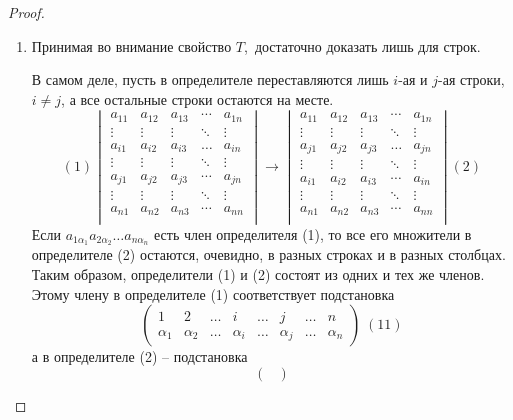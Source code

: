 \documentclass[a4paper,12pt]{article}
\begin{document}
	\begin{proof}
		\
		\begin{enumerate}
			\item Принимая во внимание свойство $T$,\ достаточно доказать лишь для строк.
			
			В самом деле, пусть в определителе переставляются лишь $i$-ая и $j$-ая строки,\ $i\ne j$, а все остальные строки остаются на месте. 
			\[ (1)
			\begin{vmatrix}
			a_{11} & a_{12} & a_{13} & \cdots & a_{1n}\\
			\vdots & \vdots & \vdots & \ddots & \vdots\\
			a_{i1} & a_{i2} & a_{i3} & \ldots & a_{in}\\
			\vdots & \vdots & \vdots & \ddots & \vdots\\
			a_{j1} & a_{j2} & a_{j3} & \cdots & a_{jn}\\
			\vdots & \vdots & \vdots &\ddots & \vdots\\
			a_{n1} & a_{n2} & a_{n3} & \cdots & a_{nn}\\
			\end{vmatrix} \to
			\begin{vmatrix}
			a_{11} & a_{12} & a_{13} & \cdots & a_{1n}\\
			\vdots & \vdots & \vdots & \ddots & \vdots\\
			a_{j1} & a_{j2} & a_{j3} & \ldots & a_{jn}\\
			\vdots & \vdots & \vdots & \ddots & \vdots\\
			a_{i1} & a_{i2} & a_{i3} & \cdots & a_{in}\\
			\vdots & \vdots & \vdots &\ddots & \vdots\\
			a_{n1} & a_{n2} & a_{n3} & \cdots & a_{nn}\\
			\end{vmatrix}
			(2)
			\]
			Если $a_{1 \alpha_1} a_{2\alpha_2}\ldots a_{n\alpha_n}$ есть член определителя (1), то все его множители в определителе (2) остаются, очевидно, в разных строках и в разных столбцах. Таким образом, определители (1) и (2) состоят из одних и тех же членов. Этому члену в определителе (1) соответствует подстановка
			\[
			\begin{pmatrix}
			1 & 2 & \ldots & i & \ldots & j & \ldots & n\\
			\alpha_1 & \alpha_2 & \ldots & \alpha_i & \ldots & \alpha_j & \ldots  & \alpha_n
			\end{pmatrix} \; (11)
			\]
			а в определителе (2) -- подстановка
			\[
			\begin{pmatrix}

\end{pmatrix}\]
\end{enumerate}
\end{proof}
\end{document}
